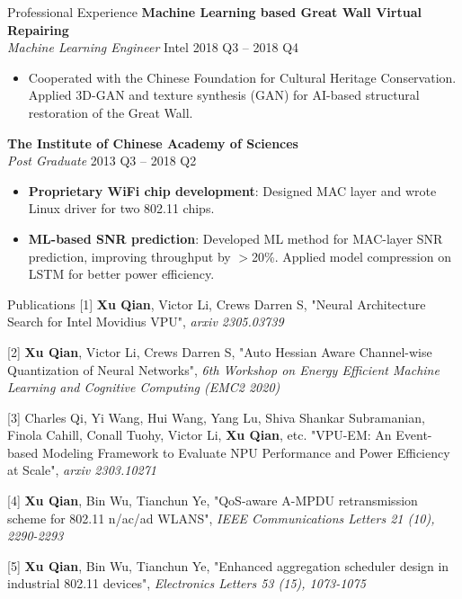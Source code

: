 \documentclass{resume} %
\begin{document}
\begin{rSection}{Professional Experience}
\textbf{Machine Learning based Great Wall Virtual Repairing} \\
\textit{Machine Learning Engineer} \hfill Intel \hfill 2018 Q3 -- 2018 Q4
\begin{itemize}
\item Cooperated with the Chinese Foundation for Cultural Heritage Conservation. Applied 3D-GAN and texture synthesis (GAN) for AI-based structural restoration of the Great Wall.
\end{itemize}

\textbf{The Institute of Chinese Academy of Sciences} \\
\textit{Post Graduate} \hfill 2013 Q3 -- 2018 Q2
\begin{itemize}
    \item \textbf{Proprietary WiFi chip development}: Designed MAC layer and wrote Linux driver for two 802.11 chips.
    \item \textbf{ML-based SNR prediction}: Developed ML method for MAC-layer SNR prediction, improving throughput by $>$20\%. Applied model compression on LSTM for better power efficiency.
\end{itemize}


    
\end{rSection}

\begin{rSection}{Publications}{}
[1] \textbf{Xu Qian}, Victor Li, Crews Darren S, "Neural Architecture Search for Intel Movidius VPU", \textit{arxiv 2305.03739}

[2] \textbf{Xu Qian}, Victor Li, Crews Darren S, "Auto Hessian Aware Channel-wise Quantization of Neural Networks", \textit{6th Workshop on Energy Efficient Machine Learning and Cognitive Computing (EMC2 2020)}

[3] Charles Qi, Yi Wang, Hui Wang, Yang Lu, Shiva Shankar Subramanian, Finola Cahill, Conall Tuohy, Victor Li, \textbf{Xu Qian}, etc. "VPU-EM: An Event-based Modeling Framework to Evaluate NPU Performance and Power Efficiency at Scale", \textit{arxiv 2303.10271}

[4] \textbf{Xu Qian}, Bin Wu, Tianchun Ye, "QoS-aware A-MPDU retransmission scheme for 802.11 n/ac/ad WLANS", \textit{IEEE Communications Letters 21 (10), 2290-2293}

[5] \textbf{Xu Qian}, Bin Wu, Tianchun Ye, "Enhanced aggregation scheduler design in industrial 802.11 devices", \textit{Electronics Letters 53 (15), 1073-1075}

\end{rSection}
\end{document}
